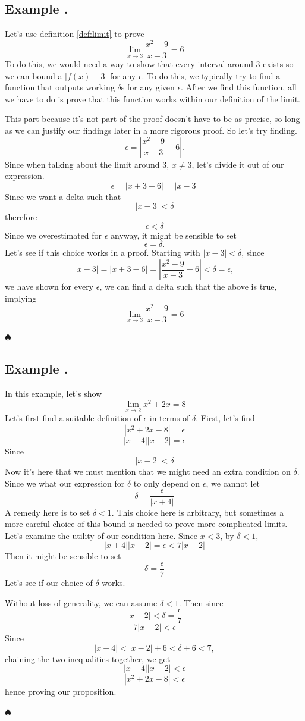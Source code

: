 \documentclass[11pt]{article}
\numberwithin{lemma}{section}
\numberwithin{equation}{section}
\numberwithin{define}{section}
\numberwithin{prop}{section}
\numberwithin{figure}{section}
\numberwithin{theorem}{section}
\numberwithin{cor}{section}
\newcounter{ex}[section]
\newenvironment{ex}[0]{

	\refstepcounter{ex}
    \subsection*{Example \theex .}
    }
    {
    \hfill$\spadesuit$
    \par
    }
\numberwithin{ex}{section}
\def\abs#1{\left\lvert #1 \right\rvert}
\begin{document}
\begin{ex}
	Let's use definition \eqref{def:limit} to prove
	$$\lim_{x\to3}\frac{x^2-9}{x-3}=6$$
	To do this, we would need a way to show that every interval around 3 exists so we can bound a $|f(x)-3|$ for any $\epsilon$. To do this, we typically try to find a function that outputs working $\delta$s for any given $\epsilon$. After we find this function, all we have to do is prove that this function works within our definition of the limit.
	
	This part because it's not part of the proof doesn't have to be as precise, so long as we can justify our findings later in a more rigorous proof. So let's try finding.
	$$\epsilon=\abs{\frac{x^2-9}{x-3}-6}.$$
	Since when talking about the limit around $3$, $x\neq3$, let's divide it out of our expression.
	$$\epsilon=\abs{x+3-6}=|x-3|$$
	Since we want a delta such that
	$$|x-3|<\delta$$
	therefore
	$$\epsilon<\delta$$
	Since we overestimated for $\epsilon$ anyway, it might be sensible to set
	$$\epsilon=\delta.$$
	Let's see if this choice works in a proof. Starting with $|x-3|<\delta$, since
	$$|x-3|=|x+3-6|=\abs{\frac{x^2-9}{x-3}-6}<\delta=\epsilon,$$
	we have shown for every $\epsilon$, we can find a delta such that the above is true, implying
	$$\lim_{x\to3}\frac{x^2-9}{x-3}=6$$
\end{ex}

\begin{ex}
	In this example, let's show
	$$\lim_{x\to2}x^2+2x=8$$
	Let's first find a suitable definition of $\epsilon$ in terms of $\delta$.
	First, let's find
	$$|x^2+2x-8|=\epsilon$$
	$$|x+4||x-2|=\epsilon$$
	Since
	$$|x-2|<\delta$$
	Now it's here that we must mention that we might need an extra condition on $\delta$.
	Since we what our expression for $\delta$ to only depend on $\epsilon$, we cannot let
	$$\delta=\frac{\epsilon}{|x+4|}$$
	A remedy here is to set $\delta<1$. This choice here is arbitrary, but sometimes a more careful choice of this bound is needed to prove more complicated limits.
	Let's examine the utility of our condition here. Since $x<3$, by $\delta<1$,
	$$|x+4||x-2|=\epsilon<7|x-2|$$
	Then it might be sensible to set
	$$\delta=\frac{\epsilon}{7}$$
	Let's see if our choice of $\delta$ works. 
	
	Without loss of generality, we can assume $\delta<1$. Then since
	$$|x-2|<\delta=\frac{\epsilon}{7}$$
	$$7|x-2|<\epsilon$$
	Since
	$$|x+4|<|x-2|+6<\delta+6<7,$$
	chaining the two inequalities together, we get
	$$|x+4||x-2|<\epsilon$$
	$$|x^2+2x-8|<\epsilon$$
	hence proving our proposition.
\end{ex}
\end{document}

